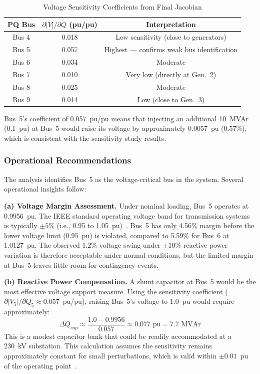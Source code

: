 \documentclass[12pt, a4paper]{article}
\begin{document}
\begin{table}[htbp]
\centering
\caption{Voltage Sensitivity Coefficients from Final Jacobian}
\label{tab:sens_coeff}
\begin{tabular}{c c c}
\toprule
\textbf{PQ Bus} & \textbf{$\partial |V| / \partial Q$ (pu/pu)} & \textbf{Interpretation} \\
\midrule
Bus 4 & 0.018 & Low sensitivity (close to generators) \\
Bus 5 & 0.057 & Highest --- confirms weak bus identification \\
Bus 6 & 0.034 & Moderate \\
Bus 7 & 0.010 & Very low (directly at Gen.\ 2) \\
Bus 8 & 0.025 & Moderate \\
Bus 9 & 0.014 & Low (close to Gen.\ 3) \\
\bottomrule
\end{tabular}
\end{table}

Bus~5's coefficient of 0.057~pu/pu means that injecting an additional 10~MVAr (0.1~pu) at Bus~5 would raise its voltage by approximately 0.0057~pu (0.57\%), which is consistent with the sensitivity study results.

\subsubsection{Operational Recommendations}
\label{sec:operational_recommendations}
The analysis identifies Bus~5 as the voltage-critical bus in the system. Several operational insights follow:

\textbf{(a) Voltage Margin Assessment.}
Under nominal loading, Bus~5 operates at 0.9956~pu. The IEEE standard operating voltage band for transmission systems is typically $\pm 5\%$ (i.e., 0.95 to 1.05~pu)~\cite{ieee1547}. Bus~5 has only 4.56\% margin before the lower voltage limit (0.95~pu) is violated, compared to 5.59\% for Bus~6 at 1.0127~pu. The observed 1.2\% voltage swing under $\pm 10\%$ reactive power variation is therefore acceptable under normal conditions, but the limited margin at Bus~5 leaves little room for contingency events.

\textbf{(b) Reactive Power Compensation.}
A shunt capacitor at Bus~5 would be the most effective voltage support measure. Using the sensitivity coefficient ($\partial |V_5|/\partial Q_5 \approx 0.057$~pu/pu), raising Bus~5's voltage to 1.0~pu would require approximately:
\begin{equation}
\Delta Q_{cap} \approx \frac{1.0 - 0.9956}{0.057} \approx 0.077 \text{~pu} = 7.7 \text{~MVAr}
\end{equation}
This is a modest capacitor bank that could be readily accommodated at a 230~kV substation. This calculation assumes the sensitivity remains approximately constant for small perturbations, which is valid within $\pm 0.01$~pu of the operating point~\cite{saadat}.
\end{document}
